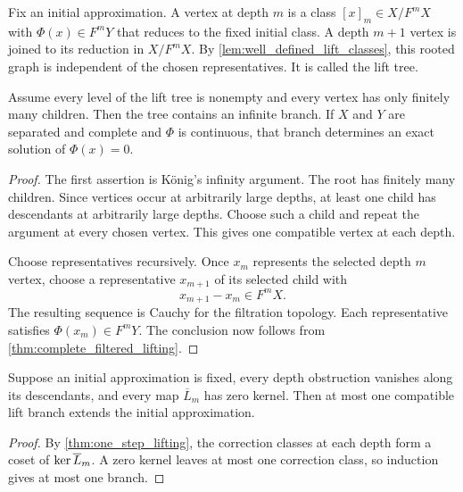 \begin{definition}\label{def:lift_tree}
Fix an initial approximation.  A vertex at depth $m$ is a class $[x]_m\in X/F^mX$ with $\Phi(x)\in F^mY$ that reduces to the fixed initial class.  A depth $m+1$ vertex is joined to its reduction in $X/F^mX$.  By \cref{lem:well_defined_lift_classes}, this rooted graph is independent of the chosen representatives.  It is called the lift tree.
\end{definition}

\begin{theorem}\label{thm:finitely_branching_lift_tree}
Assume every level of the lift tree is nonempty and every vertex has only finitely many children.  Then the tree contains an infinite branch.  If $X$ and $Y$ are separated and complete and $\Phi$ is continuous, that branch determines an exact solution of $\Phi(x)=0$.
\end{theorem}

\begin{proof}
The first assertion is K\"onig's infinity argument.  The root has finitely many children.  Since vertices occur at arbitrarily large depths, at least one child has descendants at arbitrarily large depths.  Choose such a child and repeat the argument at every chosen vertex.  This gives one compatible vertex at each depth.

Choose representatives recursively.  Once $x_m$ represents the selected depth $m$ vertex, choose a representative $x_{m+1}$ of its selected child with
\[
x_{m+1}-x_m\in F^mX.
\]
The resulting sequence is Cauchy for the filtration topology.  Each representative satisfies $\Phi(x_m)\in F^mY$.  The conclusion now follows from \cref{thm:complete_filtered_lifting}.
\end{proof}

\begin{corollary}\label{cor:unique_lift_branch}
Suppose an initial approximation is fixed, every depth obstruction vanishes along its descendants, and every map $\overline L_m$ has zero kernel.  Then at most one compatible lift branch extends the initial approximation.
\end{corollary}

\begin{proof}
By \cref{thm:one_step_lifting}, the correction classes at each depth form a coset of $\operatorname{ker}\overline L_m$.  A zero kernel leaves at most one correction class, so induction gives at most one branch.
\end{proof}

